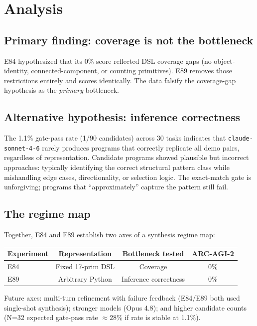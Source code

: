 \documentclass[11pt]{article}
\begin{document}
\section{Analysis}
\label{sec:analysis}

\subsection{Primary finding: coverage is not the bottleneck}

E84 hypothesized that its 0\% score reflected DSL coverage gaps (no
object-identity, connected-component, or counting primitives).  E89 removes
those restrictions entirely and scores identically.  The data falsify the
coverage-gap hypothesis as the \emph{primary} bottleneck.

\subsection{Alternative hypothesis: inference correctness}

The 1.1\% gate-pass rate (1/90 candidates) across 30 tasks indicates that
\texttt{claude-sonnet-4-6} rarely produces programs that correctly replicate
all demo pairs, regardless of representation.  Candidate programs showed
plausible but incorrect approaches: typically identifying the correct
structural pattern class while mishandling edge cases, directionality, or
selection logic.  The exact-match gate is unforgiving; programs that
``approximately'' capture the pattern still fail.

\subsection{The regime map}

Together, E84 and E89 establish two axes of a synthesis regime map:

\begin{center}
\begin{tabular}{lccc}
\toprule
Experiment & Representation & Bottleneck tested & ARC-AGI-2 \\
\midrule
E84 & Fixed 17-prim DSL & Coverage & 0\% \\
E89 & Arbitrary Python & Inference correctness & 0\% \\
\bottomrule
\end{tabular}
\end{center}

Future axes: multi-turn refinement with failure feedback (E84/E89 both
used single-shot synthesis); stronger models (Opus 4.8); and higher candidate
counts (N=32 expected gate-pass rate $\approx 28$\% if rate is stable at
1.1\%).
\end{document}
